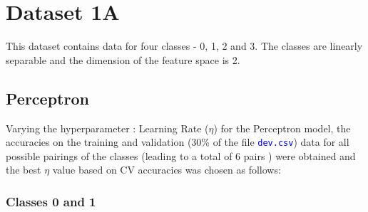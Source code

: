 \documentclass[11pt,a4paper]{article}
\def\colortt#1{\textcolor{blue}{\texttt{#1}}}
\begin{document}
{\hypersetup{linkcolor=black}
 \tableofcontents}
\break


\section{Dataset 1A}
This dataset contains data for four classes - 0, 1, 2 and 3. The classes are linearly separable and the dimension of the feature space is 2.
\subsection{Perceptron}
Varying the hyperparameter : Learning Rate ($\eta$) for the Perceptron model, the accuracies on the training and validation (30\% of the file \colortt{dev.csv}) data for all possible pairings of the classes (leading to a total of 6 pairs ) were obtained and the best $\eta$ value based on CV accuracies was chosen as follows:
\subsubsection{Classes 0 and 1}

\end{document}

